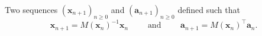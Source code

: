 Two sequences 
$(\mathbf{x}_{n+1})_{n\geq0}$ and 
$(\mathbf{a}_{n+1})_{n\geq0}$ defined such that
\[
    \mathbf{x}_{n+1}=M(\mathbf{x}_n)^{-1}\mathbf{x}_n
    \qquad\text{ and }\qquad
    \mathbf{a}_{n+1}=M(\mathbf{x}_n)^\top\mathbf{a}_n.
\]
